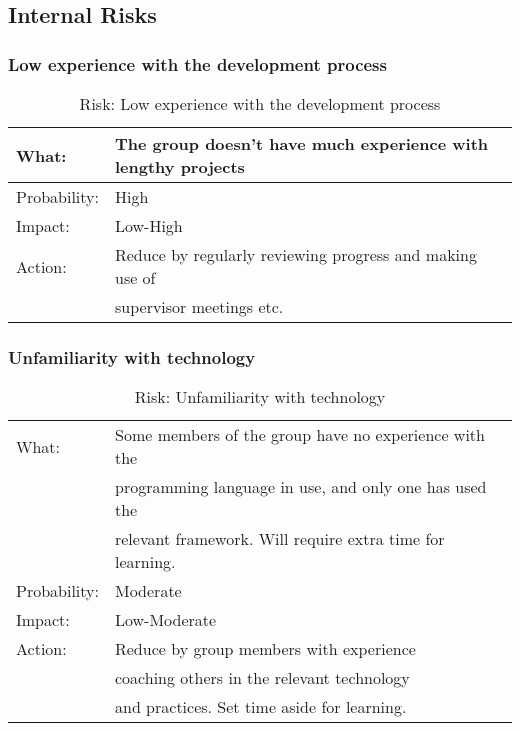 
\subsection{Internal Risks}
\subsubsection{Low experience with the development process}
\begin{table}[H]
\begin{tabular}{| l | l |}
	\hline
	What: & The group doesn't have much experience with lengthy projects\\
	\hline
	Probability: & High \\
	\hline
	Impact: & Low-High \\
	\hline
	Action: & Reduce by regularly reviewing progress and making use of \\
			& supervisor meetings etc.\\
	\hline
\end{tabular}
\caption{Risk: Low experience with the development process}
\end{table}

\subsubsection{Unfamiliarity with technology}
\begin{table}[H]
\begin{tabular}{| l | l |}
	\hline
	What: & Some members of the group have no experience with the \\
		& programming language in use, and only one has used the \\
		& relevant framework. Will require extra time for learning.\\
	\hline
	Probability: & Moderate \\
	\hline
	Impact: & Low-Moderate \\
	\hline
	Action: & Reduce by group members with experience \\
	& coaching others in the relevant technology\\
	& and practices. Set time aside for learning.\\
	\hline
\end{tabular}
\caption{Risk: Unfamiliarity with technology}
\end{table}

